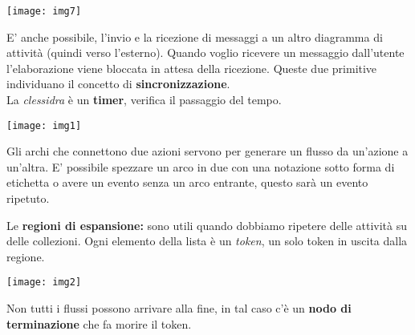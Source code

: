 \texttt{[image: img7]}

E' anche possibile, l'invio e la ricezione di messaggi a un altro diagramma di attività (quindi verso l'esterno). Quando voglio ricevere un messaggio dall'utente l'elaborazione viene bloccata in attesa della ricezione. Queste due primitive individuano il concetto di \textbf{sincronizzazione}.\\
La \textit{clessidra} è un \textbf{timer}, verifica il passaggio del tempo.

\texttt{[image: img1]}

Gli archi che connettono due azioni servono per generare un flusso da un'azione a un'altra. E' possibile spezzare un arco in due con una notazione sotto forma di etichetta o avere un evento senza un arco entrante, questo sarà un evento ripetuto.

Le \textbf{regioni di espansione:} sono utili quando dobbiamo ripetere delle attività su delle collezioni. Ogni elemento della lista è un \textit{token}, un solo token in uscita dalla regione.

\texttt{[image: img2]}

Non tutti i flussi possono arrivare alla fine, in tal caso c'è un \textbf{nodo di terminazione} che fa morire il token.



